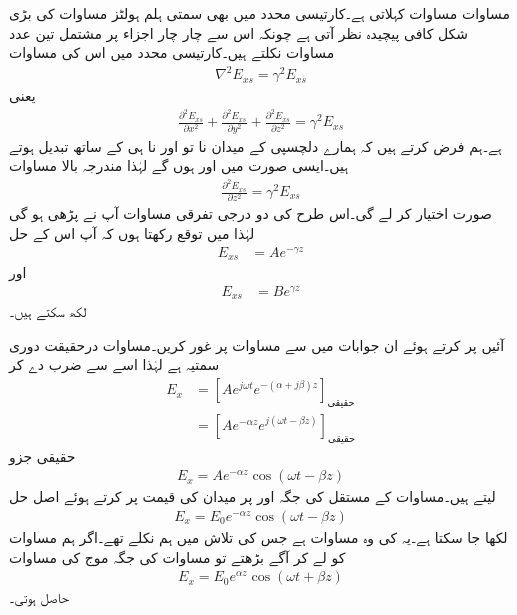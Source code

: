  مساوات    مساوات کہلاتی ہے۔کارتیسی محدد میں بھی سمتی ہلم ہولٹز مساوات کی بڑی شکل  کافی پیچیدہ نظر آتی ہے چونکہ اس سے چار چار اجزاء پر مشتمل تین عدد مساوات نکلتے ہیں۔کارتیسی محدد میں اس  کی  مساوات 
\begin{align}
\nabla^2 E_{xs}=\gamma^2 E_{xs} 
\end{align}
یعنی
\begin{align}
\frac{\partial^2  E_{xs}}{\partial x^2}+\frac{\partial^2  E_{xs}}{\partial y^2}+\frac{\partial^2  E_{xs}}{\partial z^2} =\gamma^2  E_{xs} 
\end{align}
ہے۔ہم فرض کرتے ہیں کہ ہمارے دلچسپی کے میدان نا تو  اور نا ہی  کے ساتھ تبدیل ہوتے ہیں۔ایسی صورت
 میں  اور  ہوں گے لہٰذا  مندرجہ بالا مساوات
\begin{align}
\frac{\partial^2  E_{xs}}{\partial z^2} =\gamma^2 E_{xs} 
\end{align}
صورت اختیار کر لے گی۔اس طرح کی دو درجی تفرقی مساوات آپ نے پڑھی ہو گی لہٰذا میں توقع رکھتا ہوں کہ آپ اس کے حل
\begin{align}\label{مساوات_موج_مثبت_زیڈ_جانب}
E_{xs}&=A e^{-\gamma z}
\end{align}
اور
\begin{align}\label{مساوات_موج_منفی_زیڈ_جانب}
E_{xs}&=Be^{\gamma z}
\end{align}
لکھ سکتے ہیں۔

آئیں  پر کرتے ہوئے ان جوابات میں سے مساوات  پر غور کریں۔مساوات  درحقیقت دوری سمتیہ ہے لہٰذا اسے   سے ضرب دے کر
\begin{align*}
E_x&=\left[A e^{j \omega t} e^{-(\alpha+j \beta) z} \right]_{\textrm{حقیقی}}\\
&=\left[A e^{-\alpha z} e^{j(\omega t -\beta z)} \right]_{\textrm{حقیقی}}
\end{align*}
حقیقی  جزو
\begin{align*}
E_x=A e^{-\alpha z} \cos (\omega t -\beta z)
\end{align*}
لیتے ہیں۔مساوات کے مستقل  کی جگہ  اور  پر میدان کی قیمت  پر کرتے ہوئے اصل حل
\begin{align}\label{مساوات_موج_کوسائن_مثبت_موج}
E_x=E_0 e^{-\alpha z} \cos (\omega t -\beta z)
\end{align}
لکھا جا سکتا ہے۔یہ  کی وہ مساوات  ہے جس کی تلاش میں ہم نکلے تھے۔اگر ہم مساوات  کو لے کر آگے بڑھتے تو مساوات  کی جگہ موج کی مساوات
\begin{align}\label{مساوات_موج_کوسائن_منفی_موج}
E_x=E_0 e^{\alpha z} \cos (\omega t +\beta z)
\end{align}
حاصل ہوتی۔

